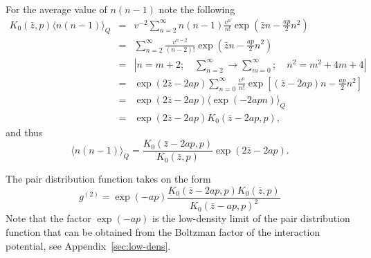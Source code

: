 For the average value of $n(n-1)$ note the following
\begin{eqnarray*}
	K_0(\bar{z}, p) \langle n(n-1) \rangle_Q & = & 
	v^{-2} \sum_{n=2}^{\infty} n(n-1) \frac{v^n}{n!} \exp(\bar{z}n - \frac{ap}{2}n^2)
	\\
	& = & \sum_{n=2}^{\infty} \frac{v^{n-2}}{(n-2)!} \exp(\bar{z}n - \frac{ap}{2}n^2)
	\\
	& = & \left| n=m+2; \quad \sum_{n=2}^{\infty} \rightarrow \sum_{m=0}^{\infty}; \quad n^2 = m^2 + 4m +4 \right|
	\\
	& = & \exp(2\bar{z} - 2ap) \sum_{n=0}^{\infty} \frac{v^n}{n!} \exp\left[(\bar{z} - 2ap)n - \frac{ap}{2}n^2 \right]
	\\
	& = & \exp(2\bar{z} - 2ap) \langle \exp(-2apn) \rangle_Q
	\\
	& = & \exp(2\bar{z} - 2ap) K_0(\bar{z} - 2ap, p),
\end{eqnarray*}
and thus
\begin{equation*}
	\langle n(n-1) \rangle_Q = \frac{K_0(\bar{z} - 2ap, p)}{K_0(\bar{z}, p)} \exp(2\bar{z} - 2ap).
\end{equation*}

The pair distribution function takes on the form
\begin{equation}
	g^{(2)} = \exp(-ap) \frac{K_0(\bar{z} - 2ap, p) K_0(\bar{z}, p)}{K_0(\bar{z}-ap, p)^2}
\end{equation}
Note that the factor $\exp(-ap)$ is the low-density limit of the pair distribution function that can be obtained from the Boltzman factor of the interaction potential, see Appendix~\ref{sec:low-dens}.



